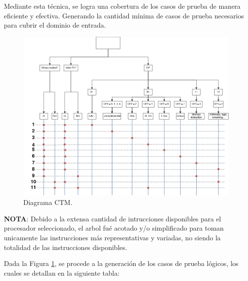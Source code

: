 \documentclass[
  11pt, %
  codirector, %
]{charter}
\begin{document}
Mediante esta técnica, se logra una cobertura de los casos de prueba de manera eficiente y efectiva. Generando la cantidad mínima de casos de prueba necesarios para cubrir el dominio de entrada.

\newpage

\begin{figure}[htpb]
  \label{fig:CTM}
  \centering
  \includegraphics[width=1\textwidth]{./Figuras/CTM.png}
  \caption{Diagrama CTM.}
\end{figure}

\vspace{25px}

\textbf{NOTA}: Debido a la extensa cantidad de intrucciones disponibles para el procesador seleccionado, el arbol fué acotado y/o simplificado para toman unicamente las instrucciones más representativas y variadas, no siendo la totalidad de las instrucciones disponibles.


Dada la Figura \ref{fig:CTM}, se procede a la generación de los casos de prueba lógicos, los cuales se detallan en la siguiente tabla:
\end{document}
